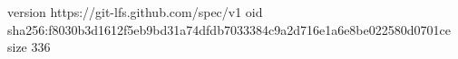 version https://git-lfs.github.com/spec/v1
oid sha256:f8030b3d1612f5eb9bd31a74dfdb7033384c9a2d716e1a6e8be022580d0701ce
size 336

